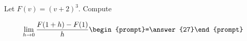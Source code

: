 \documentclass{ximera}
\author{Bart Snapp}
\begin{document}
\begin{exercise}
Let $F(v) = (v+2)^3$. Compute

\[
\lim_{ h\to 0 } \frac{F(1+h)-F(1)}{h} \begin{prompt}=\answer{27}\end{prompt}
\]
\end{exercise}
\end{document}
